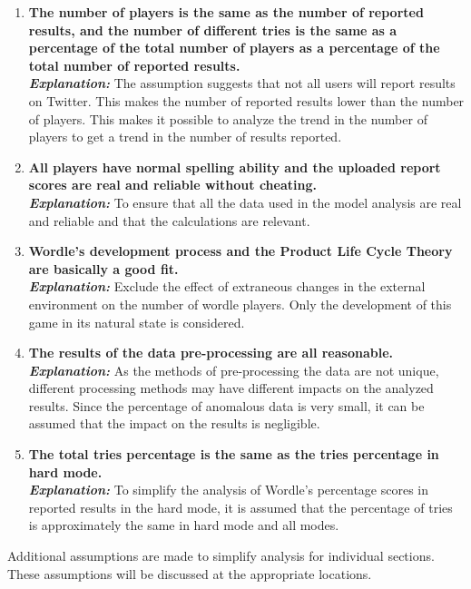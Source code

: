 \documentclass[12pt]{article}  %
\begin{document}
\begin{enumerate}
	\item \textbf{The number of players is the same as the number of reported results, and the number of different tries is the same as a percentage of the total number of players as a percentage of the total number of reported results.}\\
	\textbf{\textit{Explanation:}} The assumption suggests that not all users will report results on Twitter. This makes the number of reported results lower than the number of players. This makes it possible to analyze the trend in the number of players to get a trend in the number of results reported.
	\item \textbf{All players have normal spelling ability and the uploaded report scores are real and reliable without cheating.}\\
	\textbf{\textit{Explanation:}} To ensure that all the data used in the model analysis are real and reliable and that the calculations are relevant.
	\item \textbf{Wordle's development process and the Product Life Cycle Theory are basically a good fit.}\\
	\textbf{\textit{Explanation:}} Exclude the effect of extraneous changes in the external environment on the number of wordle players. Only the development of this game in its natural state is considered.
	\item \textbf{The results of the data pre-processing are all reasonable.}\\
	\textbf{\textit{Explanation:}} As the methods of pre-processing the data are not unique, different processing methods may have different impacts on the analyzed results. Since the percentage of anomalous data is very small, it can be assumed that the impact on the results is negligible.
	\item \textbf{The total tries percentage is the same as the tries percentage in hard mode.}\\
	\textbf{\textit{Explanation:}} To simplify the analysis of Wordle's percentage scores in reported results in the hard mode,  it is assumed that the percentage of tries is approximately the same in hard mode and all modes.
	
\end{enumerate}

Additional assumptions are made to simplify analysis for individual sections. These assumptions will be discussed at the appropriate locations.
\end{document}
